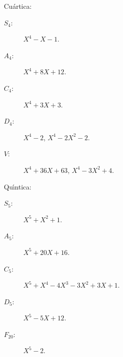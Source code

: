 \pagestyle{empty}

Cu\'{a}rtica:
\begin{description}
\item[$S_4$:]
	$X^4-X-1$.
\item[$A_4$:]
	$X^4+8X+12$.
\item[$C_4$:]
	$X^4+3X+3$.
\item[$D_4$:]
	$X^4-2$,
	$X^4-2X^2-2$.
\item[$V$:]
	$X^4+36X+63$,
	$X^4-3X^2+4$.
\end{description}

Qu\'{\i}ntica:
\begin{description}
\item[$S_5$:]
	$X^5+X^2+1$.
\item[$A_5$:]
	$X^5+20X+16$.
\item[$C_5$:]
	$X^5+X^4-4X^3-3X^2+3X+1$.
\item[$D_5$:]
	$X^5-5X+12$.
\item[$F_{20}$:]
	$X^5-2$. 
\end{description}
